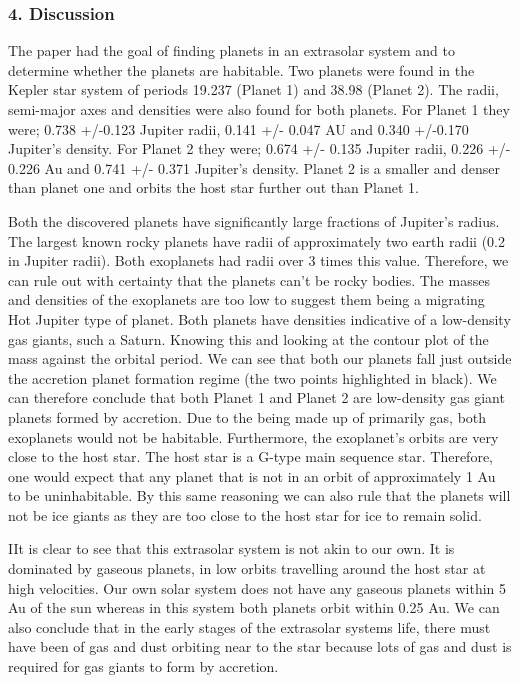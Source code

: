 \documentclass[11pt]{article}
\begin{document}
    \subsubsection{4. Discussion}\label{discussion}

    The paper had the goal of finding planets in an extrasolar system and to
determine whether the planets are habitable. Two planets were found in
the Kepler star system of periods 19.237 (Planet 1) and 38.98 (Planet
2). The radii, semi-major axes and densities were also found for both
planets. For Planet 1 they were; 0.738 +/-0.123 Jupiter radii, 0.141 +/-
0.047 AU and 0.340 +/-0.170 Jupiter's density. For Planet 2 they were;
0.674 +/- 0.135 Jupiter radii, 0.226 +/- 0.226 Au and 0.741 +/- 0.371
Jupiter's density. Planet 2 is a smaller and denser than planet one and
orbits the host star further out than Planet 1.

Both the discovered planets have significantly large fractions of
Jupiter's radius. The largest known rocky planets have radii of
approximately two earth radii (0.2 in Jupiter radii). Both exoplanets
had radii over 3 times this value. Therefore, we can rule out with
certainty that the planets can't be rocky bodies. The masses and
densities of the exoplanets are too low to suggest them being a
migrating Hot Jupiter type of planet. Both planets have densities
indicative of a low-density gas giants, such a Saturn. Knowing this and
looking at the contour plot of the mass against the orbital period. We
can see that both our planets fall just outside the accretion planet
formation regime (the two points highlighted in black). We can therefore
conclude that both Planet 1 and Planet 2 are low-density gas giant
planets formed by accretion. Due to the being made up of primarily gas,
both exoplanets would not be habitable. Furthermore, the exoplanet's
orbits are very close to the host star. The host star is a G-type main
sequence star. Therefore, one would expect that any planet that is not
in an orbit of approximately 1 Au to be uninhabitable. By this same
reasoning we can also rule that the planets will not be ice giants as
they are too close to the host star for ice to remain solid.

IIt is clear to see that this extrasolar system is not akin to our own.
It is dominated by gaseous planets, in low orbits travelling around the
host star at high velocities. Our own solar system does not have any
gaseous planets within 5 Au of the sun whereas in this system both
planets orbit within 0.25 Au. We can also conclude that in the early
stages of the extrasolar systems life, there must have been of gas and
dust orbiting near to the star because lots of gas and dust is required
for gas giants to form by accretion.
\end{document}
